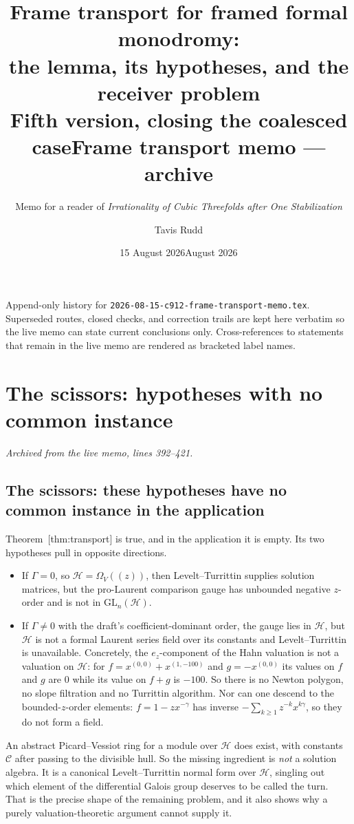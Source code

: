 \documentclass[11pt]{article}
\title{Frame transport for framed formal monodromy:\\
  the lemma, its hypotheses, and the receiver problem\\
  \large Fifth version, closing the coalesced case}
\author{Memo for a reader of \emph{Irrationality of Cubic Threefolds after One
    Stabilization}}
\date{15 August 2026}
\theoremstyle{definition}
\theoremstyle{remark}
\begin{document}
\title{Frame transport memo --- archive}
\author{Tavis Rudd}
\date{August 2026}
\maketitle

\noindent Append-only history for
\texttt{2026-08-15-c912-frame-transport-memo.tex}.  Superseded routes,
closed checks, and correction trails are kept here verbatim so the live
memo can state current conclusions only.  Cross-references to statements
that remain in the live memo are rendered as bracketed label names.


\section{The scissors: hypotheses with no common instance}
\noindent\emph{Archived from the live memo, lines 392--421.}

\subsection*{The scissors: these hypotheses have no common instance in the
application}


Theorem~\textup{[thm:transport]} is true, and in the application it is empty. Its two
hypotheses pull in opposite directions.

\begin{itemize}
\item If $\Gamma=0$, so $\mathcal H=\Omega_V(\!(z)\!)$, then Levelt--Turrittin
  supplies solution matrices, but the pro-Laurent comparison gauge has
  unbounded negative $z$-order and is not in $\mathrm{GL}_n(\mathcal H)$.
\item If $\Gamma\ne0$ with the draft's coefficient-dominant order, the gauge
  lies in $\mathcal H$, but $\mathcal H$ is not a formal Laurent series field
  over its constants and Levelt--Turrittin is unavailable. Concretely, the
  $e_z$-component of the Hahn valuation is not a valuation on $\mathcal H$:
  for $f=x^{(0,0)}+x^{(1,-100)}$ and $g=-x^{(0,0)}$ its values on $f$ and $g$
  are $0$ while its value on $f+g$ is $-100$. So there is no Newton polygon, no
  slope filtration and no Turrittin algorithm. Nor can one descend to the
  bounded-$z$-order elements: $f=1-zx^{-\gamma}$ has inverse
  $-\sum_{k\ge1}z^{-k}x^{k\gamma}$, so they do not form a field.
\end{itemize}

An abstract Picard--Vessiot ring for a module over $\mathcal H$ does exist, with
constants $\mathcal C$ after passing to the divisible hull. So the missing
ingredient is \emph{not} a solution algebra. It is a canonical Levelt--Turrittin
normal form over $\mathcal H$, singling out which element of the differential
Galois group deserves to be called the turn. That is the precise shape of the
remaining problem, and it also shows why a purely valuation-theoretic argument
cannot supply it.
\end{document}
